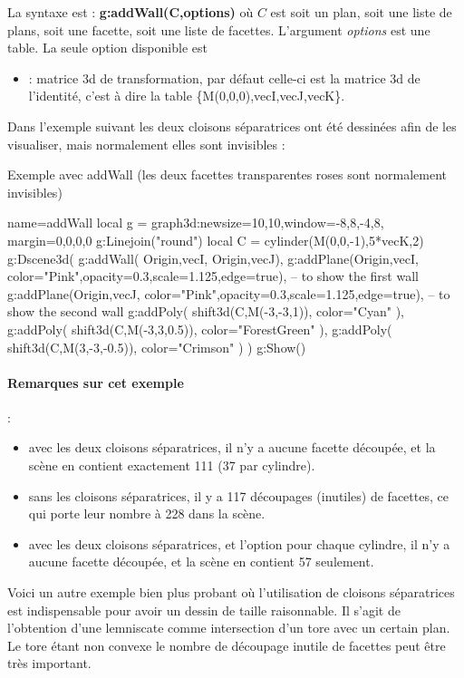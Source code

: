 La syntaxe est : \textbf{g:addWall(C,options)} où $C$ est soit un plan, soit une liste de plans, soit une facette, soit une liste de facettes. L'argument \emph{options} est une table. La seule option disponible est 
\begin{itemize}
    \item {} : matrice 3d de transformation, par défaut celle-ci est la matrice 3d de l'identité, c'est à dire la table \{M(0,0,0),vecI,vecJ,vecK\}.
\end{itemize}

Dans l'exemple suivant les deux cloisons séparatrices ont été dessinées afin de les visualiser, mais normalement elles sont invisibles :
\begin{demo}{Exemple avec addWall (les deux facettes transparentes roses sont normalement invisibles)}
\begin{luadraw}{name=addWall}
local g = graph3d:new{size={10,10},window={-8,8,-4,8}, margin={0,0,0,0}}
g:Linejoin("round")
local C = cylinder(M(0,0,-1),5*vecK,2)
g:Dscene3d(
    g:addWall( {{Origin,vecI}, {Origin,vecJ}}),
    g:addPlane({Origin,vecI}, {color="Pink",opacity=0.3,scale=1.125,edge=true}), -- to show the first wall
    g:addPlane({Origin,vecJ}, {color="Pink",opacity=0.3,scale=1.125,edge=true}), -- to show the second wall
    g:addPoly( shift3d(C,M(-3,-3,1)), {color="Cyan"} ),
    g:addPoly( shift3d(C,M(-3,3,0.5)), {color="ForestGreen"} ),
    g:addPoly( shift3d(C,M(3,-3,-0.5)), {color="Crimson"} )
)
g:Show()
\end{luadraw}
\end{demo}

\paragraph{Remarques sur cet exemple} : 
\begin{itemize}
    \item avec les deux cloisons séparatrices, il n'y a aucune facette découpée, et la scène en contient exactement 111 (37 par cylindre).
    \item sans les cloisons séparatrices, il y a 117 découpages (inutiles) de facettes, ce qui porte leur nombre à 228 dans la scène.
        \item avec les deux cloisons séparatrices, et l'option  pour chaque cylindre, il n'y a aucune facette découpée, et la scène en contient 57 seulement.
\end{itemize}

Voici un autre exemple bien plus probant où l'utilisation de cloisons séparatrices est indispensable pour avoir un dessin de taille raisonnable. Il s'agit de l'obtention d'une lemniscate comme intersection d'un tore avec un certain plan. Le tore étant non convexe le nombre de découpage inutile de facettes peut être très important.

